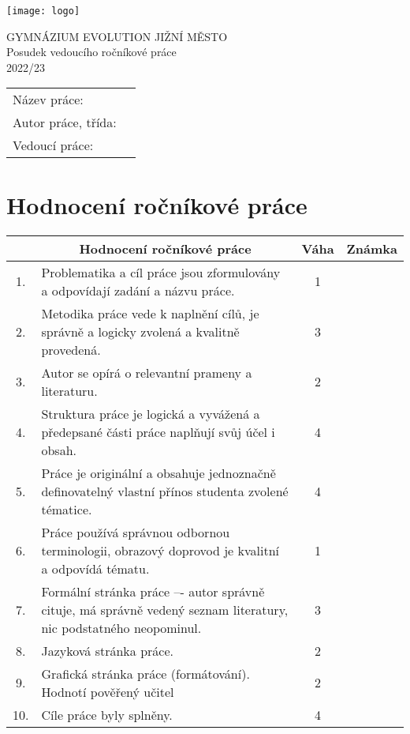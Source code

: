 \documentclass[a4paper,10pt]{article}
\begin{document}
\thispagestyle{fancy}
\begin{minipage}{.3\textwidth}
 \texttt{[image: logo]}
\end{minipage}
\hfill
\begin{minipage}{.69\textwidth}
 \centering
 \Large{\sffamily
  GYMNÁZIUM EVOLUTION JIŽNÍ MĚSTO\\
  Posudek vedoucího ročníkové práce\\
  2022/23
 }
\end{minipage}

\begin{center}
 \large{
 \begin{tabular}{ll}
  \textsf{Název práce:} &
  \textsf{
  }\\
  \textsf{Autor práce, třída:} &
  \textsf{
  }\\
  \textsf{Vedoucí práce:} &
  \textsf{
  }
 \end{tabular}
 }
\end{center}

\section*{\sffamily \centering Hodnocení ročníkové práce}

\begin{center}
 \begin{tabular}{c|m{}|c|c}
  & \multicolumn{1}{c|}{\textsf{Hodnocení ročníkové práce}} & \textsf{Váha} &
  \textsf{Známka}\\
  \toprule
  1. & Problematika a cíl práce jsou zformulovány a odpovídají zadání a názvu
  práce. & 1 &
  \\
  \midrule
  2. & Metodika práce vede k naplnění cílů, je správně a logicky zvolená a
  kvalitně provedená. & 3 &
  \\
  \midrule
  3. & Autor se opírá o relevantní prameny a literaturu. & 2 &
  \\
  \midrule
  4. & Struktura práce je logická a vyvážená a předepsané části práce naplňují
  svůj účel i obsah. & 4 &
  \\
  \midrule
  5. & Práce je originální a obsahuje jednoznačně definovatelný vlastní přínos
  studenta zvolené tématice. & 4 &
  \\
  \midrule
  6. & Práce používá správnou odbornou terminologii, obrazový doprovod je
  kvalitní a odpovídá tématu. & 1 &
  \\
  \midrule
  7. & Formální stránka práce –- autor správně cituje, má správně vedený seznam
  literatury, nic podstatného neopominul. & 3 &
  \\
  \midrule
  8. & Jazyková stránka práce. & 2 &
  \\
  \midrule
  9. & Grafická stránka práce (formátování). Hodnotí pověřený učitel & 2 &
  \\
  \midrule
  10. & Cíle práce byly splněny. & 4 &
 \end{tabular}
\end{center}
\end{document}
